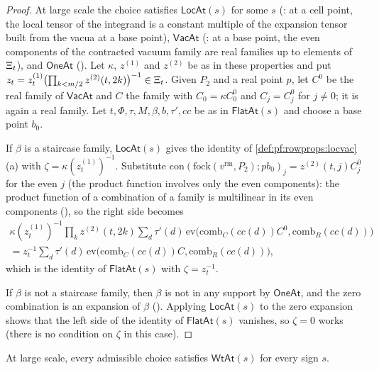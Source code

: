\begin{proof}
At large scale the choice satisfies $\mathsf{LocAt}(s)$ for some $s$ (: at a
cell point, the local tensor of the integrand is a constant multiple of the expansion tensor built from the vacua at a base
point), $\mathsf{VacAt}$ (: at a base point, the even components of the
contracted vacuum family are real families up to elements of $\Xi_t$), and $\mathsf{OneAt}$
(). Let $\kappa$, $z^{(1)}$ and $z^{(2)}$ be as in these properties and put
$z_t=z^{(1)}_t\bigl(\prod_{k<m/2}z^{(2)}(t,2k)\bigr)^{-1}\in\Xi_t$. Given $P_2$ and a real point $p$, let $C^0$ be the
real family of $\mathsf{VacAt}$ and $C$ the family with $C_0=\kappa C^0_0$ and $C_j=C^0_j$ for $j\neq0$; it is again a real
family. Let $t,\Phi,\tau,M,\beta,b,\tau',cc$ be as in $\mathsf{FlatAt}(s)$ and choose a base point $b_0$.

If $\beta$ is a staircase family, $\mathsf{LocAt}(s)$ gives the identity of \cref{def:pf:rowprops:locvac}(a) with
$\zeta=\kappa(z^{(1)}_t)^{-1}$. Substitute $\mathrm{con}(\mathrm{fock}(v^{\mathrm{rm}},P_2);pb_0)_j=z^{(2)}(t,j)C^0_j$ for the even $j$
(the product function involves only the even components): the product function of a combination of a family is multilinear
in its even components (), so the right side becomes
\begin{multline*}
\kappa(z^{(1)}_t)^{-1}\prod_kz^{(2)}(t,2k)\sum_d\tau'(d)\,\mathrm{ev}\bigl(\mathrm{comb}_C(cc(d))C^0,\mathrm{comb}_R(cc(d))\bigr)\\
=z_t^{-1}\sum_d\tau'(d)\,\mathrm{ev}\bigl(\mathrm{comb}_C(cc(d))C,\mathrm{comb}_R(cc(d))\bigr),
\end{multline*}
which is the identity of $\mathsf{FlatAt}(s)$ with $\zeta=z_t^{-1}$.

If $\beta$ is not a staircase family, then $\beta$ is not in any support by $\mathsf{OneAt}$, and the zero combination is an
expansion of $\beta$ (). Applying $\mathsf{LocAt}(s)$ to the zero expansion
shows that the left side of the identity of $\mathsf{FlatAt}(s)$ vanishes, so $\zeta=0$ works (there is no condition on $\zeta$
in this case).
\end{proof}

\begin{proposition}\label{pf:rowprops:wtat}
At large scale, every admissible choice satisfies $\mathsf{WtAt}(s)$ for every sign $s$.
\end{proposition}

